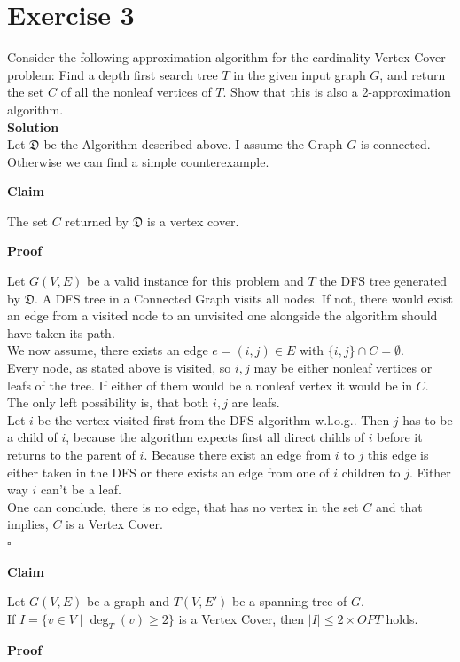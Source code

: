\documentclass[11pt,a4paper,ngerman]{article}
\newcommand{\claim}{\addtocounter{claims}{1} \bfseries Claim \arabic{claims}}
\newcommand{\proof}{\bfseries Proof}
\begin{document}
\section*{Exercise 3}
Consider the following approximation algorithm for the cardinality Vertex Cover problem: Find a depth first search tree $T$ in the given input graph $G$, and return the set $C$ of all the nonleaf vertices of $T$. Show that this is also a 2-approximation algorithm.\\

\textbf{Solution}\\
Let $\mathfrak{D}$ be the Algorithm described above. I assume the Graph $G$ is connected. Otherwise we can find a simple counterexample.

\begin{description}
	\item{\claim} The set $C$ returned by $\mathfrak{D}$ is a vertex cover.
	\item{\proof}

Let $G(V,E)$ be a valid instance for this problem and $T$ the DFS tree generated by $\mathfrak{D}$. A DFS tree in a Connected Graph visits all nodes. If not, there would exist an edge from a visited node to an unvisited one alongside the algorithm should have taken its path.\\

We now assume, there exists an edge $e=(i,j)\in E$ with $\{i , j\} \cap C = \emptyset$.\\
Every node, as stated above is visited, so $i,j$ may be either nonleaf vertices or leafs of the tree. If either of them would be a nonleaf vertex it would be in $C$. The only left possibility is, that both $i,j$ are leafs.\\
Let $i$ be the vertex visited first from the DFS algorithm w.l.o.g.. Then $j$ has to be a child of $i$, because the algorithm expects first all direct childs of $i$ before it returns to the parent of $i$. Because there exist an edge from $i$ to $j$ this edge is either taken in the DFS or there exists an edge from one of $i$ children to $j$. Either way $i$ can't be a leaf.\\

One can conclude, there is no edge, that has no vertex in the set $C$ and that implies, $C$ is a Vertex Cover.\\
\mbox{} \hfill $\square$  

\pagebreak

	\item{\claim} Let $G(V,E)$ be a graph and $T(V,E')$ be a spanning tree of $G$. \\If $I = \{v \in V \; | \; \deg_T (v) \geq 2\}$ is a Vertex Cover, then 
			$|I| \leq 2 \times OPT$ holds.
	\item{\proof}


\end{description}
\end{document}
